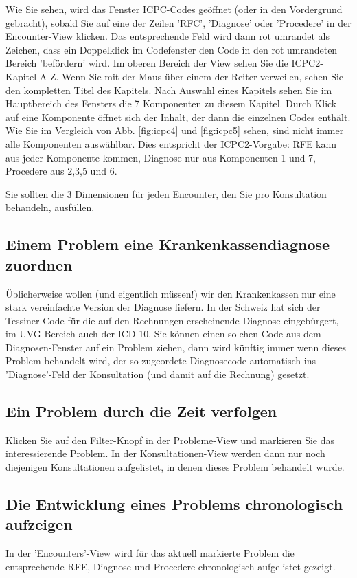 \documentclass[a4paper]{scrartcl}
\begin{document}
\medskip

Wie Sie sehen, wird das Fenster ICPC-Codes geöffnet (oder in den Vordergrund gebracht), sobald Sie auf eine der Zeilen 'RFC', 'Diagnose' oder 'Procedere' in der Encounter-View klicken. Das entsprechende Feld wird dann rot umrandet als Zeichen, dass ein Doppelklick im Codefenster den Code in den rot umrandeten Bereich 'befördern' wird. Im oberen Bereich der View sehen Sie die ICPC2-Kapitel A-Z. Wenn Sie mit der Maus über einem der Reiter verweilen, sehen Sie den kompletten Titel des Kapitels. Nach Auswahl eines Kapitels sehen Sie im Hauptbereich des Fensters die 7 Komponenten zu diesem Kapitel. Durch Klick auf eine Komponente öffnet sich der Inhalt, der dann die einzelnen Codes enthält. Wie Sie im Vergleich von Abb. \ref{fig:icpc4} und \ref{fig:icpc5} sehen, sind nicht immer alle Komponenten auswählbar. Dies entspricht der ICPC2-Vorgabe: RFE kann aus jeder Komponente kommen, Diagnose nur aus Komponenten 1 und 7, Procedere aus 2,3,5 und 6.

\medskip

Sie sollten die 3 Dimensionen für jeden Encounter, den Sie pro Konsultation behandeln, ausfüllen.


\subsection{Einem Problem eine Krankenkassendiagnose zuordnen}
Üblicherweise wollen (und eigentlich müssen!) wir den Krankenkassen nur eine stark vereinfachte Version der Diagnose liefern. In der Schweiz hat sich der Tessiner Code für die auf den Rechnungen erscheinende Diagnose eingebürgert, im UVG-Bereich auch der ICD-10. Sie können einen solchen Code aus dem Diagnosen-Fenster auf ein Problem ziehen, dann wird künftig immer wenn dieses Problem behandelt wird, der so zugeordete Diagnosecode automatisch ins 'Diagnose'-Feld der Konsultation (und damit auf die Rechnung) gesetzt.

\subsection{Ein Problem durch die Zeit verfolgen}
Klicken Sie auf den Filter-Knopf in der Probleme-View und markieren Sie das interessierende Problem.  In der Konsultationen-View werden dann nur noch diejenigen Konsultationen aufgelistet, in denen dieses Problem behandelt wurde.

\subsection{Die Entwicklung eines Problems chronologisch aufzeigen}
In der 'Encounters'-View wird für das aktuell markierte Problem die entsprechende RFE, Diagnose und Procedere chronologisch aufgelistet gezeigt.
\end{document}
